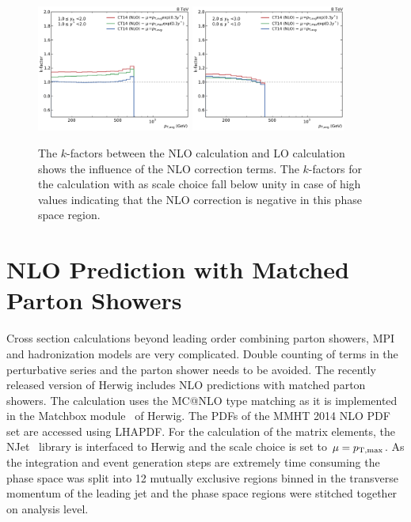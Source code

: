 \begin{figure}[htp]
    \includegraphics[width=0.45\textwidth]{figures/theory/kfactor_comp_yb1ys1.pdf}\hfill
    \includegraphics[width=0.45\textwidth]{figures/theory/kfactor_comp_yb2ys0.pdf}
    \caption[NLO $k$-factors of fastNLO calculation]{The $k$-factors between the NLO calculation and LO calculation
        shows the influence of the NLO correction terms. The $k$-factors for the
        calculation with \ptavg as scale choice fall below unity in case of high
        \ystar values indicating that the NLO correction is negative in this
        phase space region.}
    \label{fig:kfactor_comp}
\end{figure}

\section{NLO Prediction with Matched Parton Showers}

Cross section calculations beyond leading order combining parton showers, MPI
and hadronization models are very complicated. Double counting of terms in the
perturbative series and the parton shower needs to be avoided. The recently
released version of Herwig includes NLO predictions with matched parton showers.
The calculation uses the MC@NLO type matching as it is implemented in the
Matchbox module~\cite{Platzer:2011bc} of Herwig. The PDFs of the MMHT 2014 NLO
PDF set are accessed using LHAPDF. For the calculation of the matrix elements,
the NJet~\cite{Badger:2012pg} library is interfaced to Herwig and the scale
choice is set to $\mu = p_{\mathrm{T,max}}$. As the integration and event generation steps
are extremely time consuming the phase space was split into 12 mutually
exclusive regions binned in the transverse momentum of the leading jet and the
phase space regions were stitched together on analysis level.

